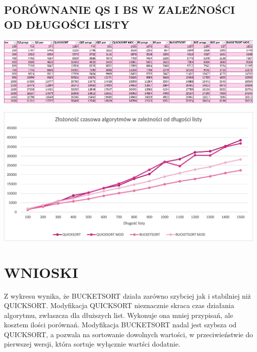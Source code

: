 \documentclass{article}
\begin{document}
	\subsection*{PORÓWNANIE QS I BS W ZALEŻNOŚCI OD DŁUGOŚCI LISTY}
	\begin{center}
		\includegraphics[width = \textwidth]{Obraz3.jpg}
	\end{center} 
	\begin{center}
		\includegraphics[width = \textwidth]{Obraz4.jpg}
	\end{center}
	\section*{WNIOSKI}
	Z wykresu wynika, że BUCKETSORT działa zarówno szybciej jak i stabilniej niż QUICKSORT. Modyfikacja QUICKSORT nieznacznie skraca czas działania algorytmu, zwłaszcza dla dłuższych list. Wykonuje ona mniej przypisań, ale kosztem ilości porównań. Modyfikacja BUCKETSORT nadal jest szybsza od QUICKSORT, a pozwala na sortowanie dowolnych wartości, w przeciwieństwie do pierwszej wersji, która sortuje wyłącznie wartści dodatnie.
\end{document}

